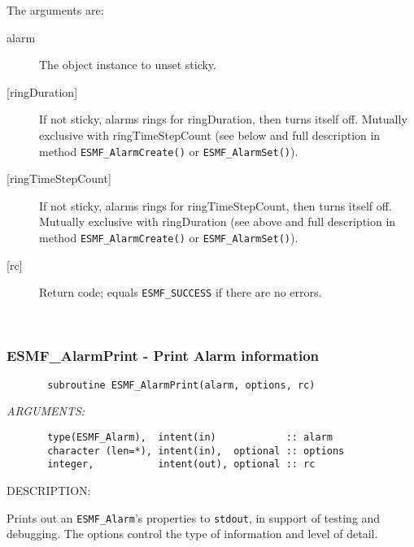        The arguments are:
       \begin{description}
       \item[alarm]
            The object instance to unset sticky.
       \item[{[ringDuration]}]
            If not sticky, alarms rings for ringDuration, then turns itself off.
            Mutually exclusive with ringTimeStepCount (see below and full
            description in method {\tt ESMF\_AlarmCreate()} or
            {\tt ESMF\_AlarmSet()}).
       \item[{[ringTimeStepCount]}]
            \begin{sloppypar}
            If not sticky, alarms rings for ringTimeStepCount, then turns
            itself off.  Mutually exclusive with ringDuration (see above and
            full description in method {\tt ESMF\_AlarmCreate()} or
            {\tt ESMF\_AlarmSet()}).
            \end{sloppypar}
       \item[{[rc]}]
            Return code; equals {\tt ESMF\_SUCCESS} if there are no errors.
       \end{description}
   
 
\mbox{}\hrulefill\ 
 
\subsubsection [ESMF\_AlarmPrint] {ESMF\_AlarmPrint - Print Alarm information}


 
\begin{verbatim}       subroutine ESMF_AlarmPrint(alarm, options, rc)
 \end{verbatim}{\em ARGUMENTS:}
\begin{verbatim}       type(ESMF_Alarm),  intent(in)            :: alarm
       character (len=*), intent(in),  optional :: options
       integer,           intent(out), optional :: rc
 \end{verbatim}
{\sf DESCRIPTION:\\ }


       Prints out an {\tt ESMF\_Alarm}'s properties to {\tt stdout}, in support
       of testing and debugging.  The options control the type of information
       and level of detail. \\
  
